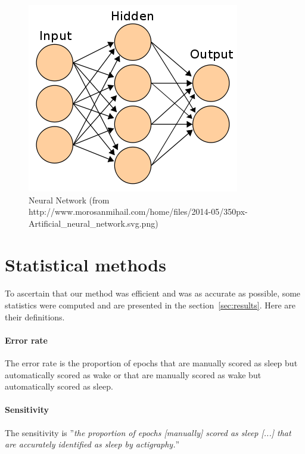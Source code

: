 \documentclass[a4paper,12pt]{article}
\begin{document}
\begin{figure}[H]
\centering
\includegraphics[scale=0.5]{Images/ANN.png}
\caption{Neural Network (from http://www.morosanmihail.com/home/files/2014-05/350px-Artificial\_neural\_network.svg.png)}
\end{figure}

\newpage

\section{Statistical methods}
\label{sec:statMethods}

\paragraph{}
To ascertain that our method was efficient and was as accurate as possible, some statistics were computed and are presented in the section~\ref{sec:results}. Here are their definitions.

\paragraph{Error rate} The error rate is the proportion of epochs that are manually scored as sleep but automatically scored as wake or that are manually scored as wake but automatically scored as sleep.

\paragraph{Sensitivity} The sensitivity is ''\textit{the proportion of epochs [manually] scored as sleep [...] that are accurately identified as sleep by actigraphy.}''\cite{LisaJ.MeltzerHawleyE.Montgomery-DownsSalvatoreP.Insana2012}
\end{document}
